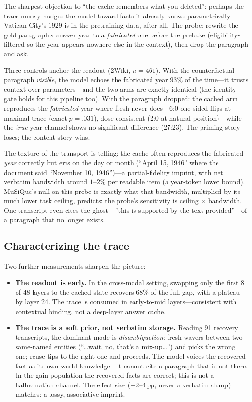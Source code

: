 \documentclass{article} %
\newcommand{\pp}{\,\mathrm{pp}}
\begin{document}
The sharpest objection to ``the cache remembers what you deleted'': perhaps the trace merely nudges the model toward facts it already knows parametrically---Vatican City's 1929 is in the pretraining data, after all. The probe: rewrite the gold paragraph's answer year to a \emph{fabricated} one before the prebake (eligibility-filtered so the year appears nowhere else in the context), then drop the paragraph and ask.

Three controls anchor the readout (2Wiki, $n=461$). With the counterfactual paragraph \emph{visible}, the model echoes the fabricated year $93\%$ of the time---it trusts context over parameters---and the two arms are exactly identical (the identity gate holds for this pipeline too). With the paragraph dropped: the cached arm reproduces the \emph{fabricated} year where fresh never does---6:0 one-sided flips at maximal trace (exact $p{=}.031$), dose-consistent (2:0 at natural position)---while the \emph{true}-year channel shows no significant difference (27:23). The priming story loses; the content story wins.

The texture of the transport is telling: the cache often reproduces the fabricated \emph{year} correctly but errs on the day or month (``April 15, 1946'' where the document said ``November 10, 1946'')---a partial-fidelity imprint, with net verbatim bandwidth around $1$--$2\%$ per readable item (a year-token lower bound). MuSiQue's null on this probe is exactly what that bandwidth, multiplied by its much lower task ceiling, predicts: the probe's sensitivity is ceiling $\times$ bandwidth. One transcript even cites the ghost---``this is supported by the text provided''---of a paragraph that no longer exists.

\subsection{Characterizing the trace}

Two further measurements sharpen the picture:

\begin{itemize}[leftmargin=2em]
\item \textbf{The readout is early.} In the cross-modal setting, swapping only the first 8 of 48 layers to the cached state recovers $68\%$ of the full gap, with a plateau by layer 24. The trace is consumed in early-to-mid layers---consistent with contextual binding, not a deep-layer answer cache.
\item \textbf{The trace is a soft prior, not verbatim storage.} Reading 91 recovery transcripts, the dominant mode is \emph{disambiguation}: fresh wavers between two same-named entities (``\ldots wait, no, that's a mix-up\ldots'') and picks the wrong one; reuse tips to the right one and proceeds. The model voices the recovered fact as its own world knowledge---it cannot cite a paragraph that is not there. In the gain population the recovered facts are correct; this is not a hallucination channel. The effect size ($+2$--$4\pp$, never a verbatim dump) matches: a lossy, associative imprint.
\end{itemize}
\end{document}
